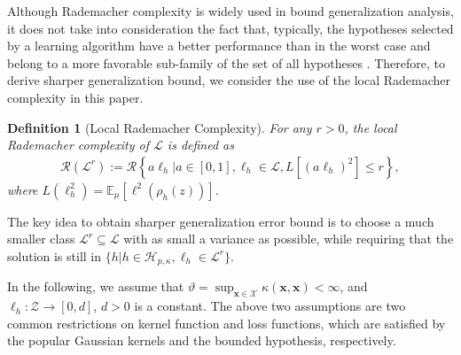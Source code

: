 \documentclass{article}
\newtheorem{definition}{Definition}
\begin{document}
Although Rademacher complexity is widely used in bound generalization analysis,
it does not take into consideration the fact that,
typically, the hypotheses selected by a learning algorithm
have a better performance than in the worst case and
belong to a more favorable sub-family of the set of all hypotheses \cite{cortes2013learning}.
Therefore, to derive sharper generalization bound,
we consider the use of the local Rademacher complexity in this paper.
 \begin{definition}[Local Rademacher Complexity]
 \label{def-thereee}
   For any $r>0$, the local Rademacher complexity of $\mathcal{L}$ is defined as
   \begin{align*}
     \mathcal{R}(\mathcal{L}^r):=
     \mathcal{R}\left\{
        a\ell_h\Big|a\in[0,1],\ell_h\in\mathcal{L},
        L[(a\ell_h)^2]\leq r
    \right\},
   \end{align*}
   where $L(\ell_h^2)=\mathbb{E}_\mu\left[\ell^2(\rho_h(z))\right]$.
 \end{definition}
 The key idea to obtain sharper generalization error bound
 is to choose a much smaller class $\mathcal{L}^r\subseteq\mathcal{L}$
 with as small a variance as possible,
 while requiring that the solution is still in $\{h|h\in\mathcal{H}_{p,\kappa},\ell_h\in \mathcal{L}^r\}$.

In the following, we assume that
$\vartheta=\sup_{\mathbf x\in \mathcal{X}}\kappa(\mathbf x,\mathbf x)< \infty$,
and $\ell_h:\mathcal{Z}\rightarrow [0,d]$,
$d>0$ is a constant.
The above two assumptions are two common restrictions on kernel function and loss functions,
which are satisfied by the popular Gaussian kernels and the bounded hypothesis, respectively.
\end{document}

